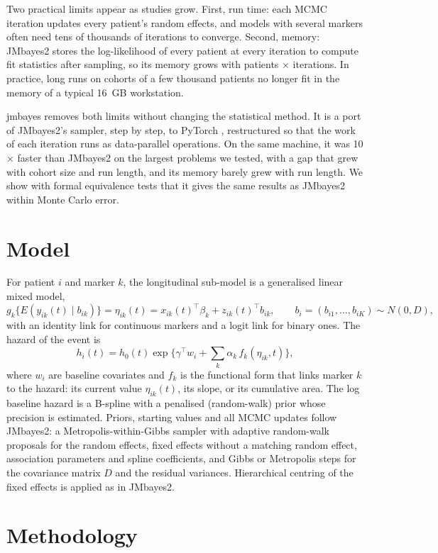 \documentclass[11pt]{article}
\begin{document}
Two practical limits appear as studies grow. First, run time: each MCMC iteration updates
every patient's random effects, and models with several markers often need tens of
thousands of iterations to converge. Second, memory: JMbayes2 stores the log-likelihood of
every patient at every iteration to compute fit statistics after sampling, so its memory
grows with patients $\times$ iterations. In practice, long runs on cohorts of a few
thousand patients no longer fit in the memory of a typical 16~GB workstation.

jmbayes removes both limits without changing the statistical method. It is a port of
JMbayes2's sampler, step by step, to PyTorch \cite{pytorch}, restructured so that the work
of each iteration runs as data-parallel operations. On the same machine, it was
10$\times$ faster than JMbayes2 on the largest problems we tested, with a gap that grew with
cohort size and run length,
and its memory barely grew with run length. We show with formal equivalence tests that
it gives the same results as JMbayes2 within Monte Carlo error.

\section{Model}

For patient $i$ and marker $k$, the longitudinal sub-model is a generalised linear mixed
model,
\[
  g_k\{E(y_{ik}(t) \mid b_{ik})\} = \eta_{ik}(t) = x_{ik}(t)^\top \beta_k + z_{ik}(t)^\top b_{ik},
  \qquad b_i = (b_{i1}, \dots, b_{iK}) \sim N(0, D),
\]
with an identity link for continuous markers and a logit link for binary ones. The hazard of
the event is
\[
  h_i(t) = h_0(t) \exp\Big\{ \gamma^\top w_i + \sum_{k} \alpha_k\, f_k(\eta_{ik}, t) \Big\},
\]
where $w_i$ are baseline covariates and $f_k$ is the functional form that links marker $k$
to the hazard: its current value $\eta_{ik}(t)$, its slope, or its cumulative area. The log
baseline hazard is a B-spline with a penalised (random-walk) prior whose precision is
estimated. Priors, starting values and all MCMC updates follow JMbayes2: a
Metropolis-within-Gibbs sampler with adaptive random-walk proposals for the random effects,
fixed effects without a matching random effect, association parameters and spline
coefficients, and Gibbs or Metropolis steps for the covariance matrix $D$ and the residual
variances. Hierarchical centring of the fixed effects is applied as in JMbayes2.

\section{Methodology}\label{sec:design}
\end{document}
